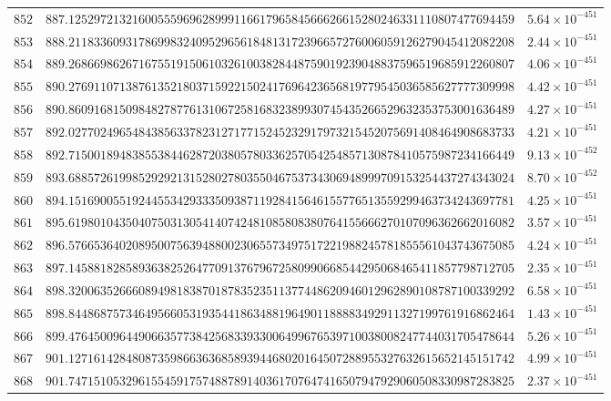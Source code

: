 \documentclass[12pt,reqno]{amsart}
\theoremstyle{remark}
\begin{document}
\begin{longtable}{clc}
$852$ & $887.1252972132160055596962899911661796584566626615280246331110807477694459$ & $5.64\times 10^{-451}$ \\
$853$ & $888.2118336093178699832409529656184813172396657276006059126279045412082208$ & $2.44\times 10^{-451}$ \\
$854$ & $889.2686698626716755191506103261003828448759019239048837596519685912260807$ & $4.06\times 10^{-451}$ \\
$855$ & $890.2769110713876135218037159221502417696423656819779545036585627777309998$ & $4.42\times 10^{-451}$ \\
$856$ & $890.8609168150984827877613106725816832389930745435266529632353753001636489$ & $4.27\times 10^{-451}$ \\
$857$ & $892.0277024965484385633782312717715245232917973215452075691408464908683733$ & $4.21\times 10^{-451}$ \\
$858$ & $892.7150018948385538446287203805780336257054254857130878410575987234166449$ & $9.13\times 10^{-452}$ \\
$859$ & $893.6885726199852929213152802780355046753734306948999709153254437274343024$ & $8.70\times 10^{-452}$ \\
$860$ & $894.1516900551924455342933350938711928415646155776513559299463734243697781$ & $4.25\times 10^{-451}$ \\
$861$ & $895.6198010435040750313054140742481085808380764155666270107096362662016082$ & $3.57\times 10^{-451}$ \\
$862$ & $896.5766536402089500756394880023065573497517221988245781855561043743675085$ & $4.24\times 10^{-451}$ \\
$863$ & $897.1458818285893638252647709137679672580990668544295068465411857798712705$ & $2.35\times 10^{-451}$ \\
$864$ & $898.3200635266608949818387018783523511377448620946012962890108787100339292$ & $6.58\times 10^{-451}$ \\
$865$ & $898.8448687573464956605319354418634881964901188883492911327199761916862464$ & $1.43\times 10^{-451}$ \\
$866$ & $899.4764500964490663577384256833933006499676539710038008247744031705478644$ & $5.26\times 10^{-451}$ \\
$867$ & $901.1271614284808735986636368589394468020164507288955327632615652145151742$ & $4.99\times 10^{-451}$ \\
$868$ & $901.7471510532961554591757488789140361707647416507947929060508330987283825$ & $2.37\times 10^{-451}$ \\

\end{longtable}
\end{document}
